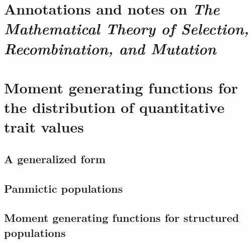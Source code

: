 \documentclass{article}
\begin{document}
\section{Annotations and notes on \emph{The Mathematical Theory of Selection, Recombination, and Mutation} \citep{burger2000mathematical}}
\subsection{\citet[chap. 4]{burger2000mathematical}}


\section{Moment generating functions for the distribution of quantitative trait values}
\subsection{A generalized form}

\subsection{Panmictic populations}

\subsection{Moment generating functions for structured populations}



\clearpage


\end{document}
